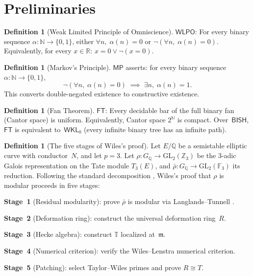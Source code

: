 \documentclass[11pt]{article}
\theoremstyle{plain}
\theoremstyle{definition}
\newtheorem{definition}[theorem]{Definition}
\theoremstyle{remark}
\newcommand{\N}{\mathbb{N}}
\newcommand{\Z}{\mathbb{Z}}
\newcommand{\Q}{\mathbb{Q}}
\newcommand{\R}{\mathbb{R}}
\newcommand{\F}{\mathbb{F}}
\newcommand{\fm}{\mathfrak{m}}
\newcommand{\GL}{\mathrm{GL}}
\newcommand{\BISH}{\mathsf{BISH}}
\newcommand{\WLPO}{\mathsf{WLPO}}
\newcommand{\MP}{\mathsf{MP}}
\newcommand{\FT}{\mathsf{FT}}
\newcommand{\WKL}{\mathsf{WKL}_0}
\begin{document}
\section{Preliminaries}\label{sec:prelim}

\begin{definition}[Weak Limited Principle of Omniscience]\label{def:wlpo}
$\WLPO$: For every binary sequence $\alpha : \N \to \{0,1\}$,
either $\forall n,\;\alpha(n) = 0$ or
$\lnot(\forall n,\;\alpha(n) = 0)$.
Equivalently, for every $x \in \R$: $x = 0 \lor \lnot(x = 0)$.
\end{definition}

\begin{definition}[Markov's Principle]\label{def:mp}
$\MP$ asserts: for every binary sequence
$\alpha\colon \N\to\{0,1\}$,
\[
  \lnot(\forall n,\;\alpha(n)=0) \;\implies\;
  \exists n,\;\alpha(n)=1.
\]
This converts double-negated existence to constructive existence.
\end{definition}

\begin{definition}[Fan Theorem]\label{def:ft}
$\FT$: Every decidable bar of the full binary fan (Cantor space) is
uniform.  Equivalently, Cantor space $2^\N$ is compact.
Over~$\BISH$, $\FT$ is equivalent to~$\WKL$ (every infinite binary
tree has an infinite path).
\end{definition}

\begin{definition}[The five stages of Wiles's proof]\label{def:stages}
Let $E/\Q$ be a semistable elliptic curve with conductor~$N$, and
let $p = 3$.  Let $\rho : G_\Q \to \GL_2(\Z_3)$ be the $3$-adic
Galois representation on the Tate module $T_3(E)$, and
$\bar{\rho} : G_\Q \to \GL_2(\F_3)$ its reduction.  Following the
standard decomposition
\cite{CSS1997, DDT1997}, Wiles's proof
that $\rho$ is modular proceeds in five stages:

\textbf{Stage~1} (Residual modularity):
prove $\bar{\rho}$ is modular via Langlands--Tunnell
\cite{Langlands1980, Tunnell1981}.

\textbf{Stage~2} (Deformation ring):
construct the universal deformation ring~$R$.

\textbf{Stage~3} (Hecke algebra):
construct $\mathbb{T}$ localized at~$\fm$.

\textbf{Stage~4} (Numerical criterion):
verify the Wiles--Lenstra numerical criterion.

\textbf{Stage~5} (Patching):
select Taylor--Wiles primes and prove $R \cong T$.
\end{definition}
\end{document}
